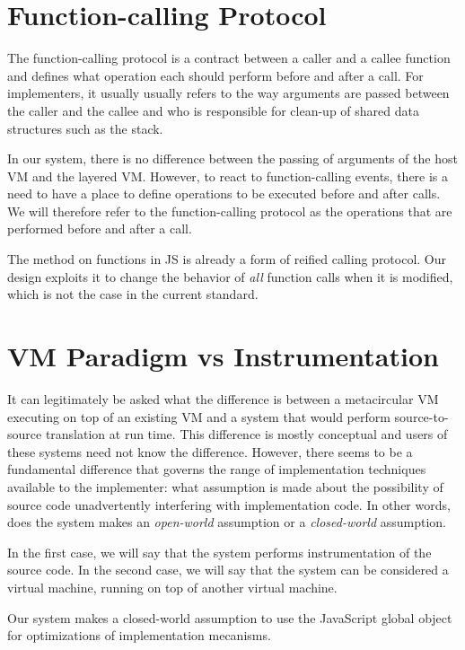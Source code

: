 \section{Function-calling Protocol}

The function-calling protocol is a contract between a caller and a callee
function and defines what operation each should perform before and after a
call. For implementers, it usually usually refers to the way arguments are
passed between the caller and the callee and who is responsible for clean-up of
shared data structures such as the stack.

In our system, there is no difference between the passing of arguments of the
host VM and the layered VM. However, to react to function-calling events, there
is a need to have a place to define operations to be executed before and after
calls. We will therefore refer to the function-calling protocol as the
operations that are performed before and after a call. 

The  method on functions in JS is already a form of reified calling
protocol. Our design exploits it to change the behavior of \textit{all} function
calls when it is modified, which is not the case in the current standard.

\section{VM Paradigm vs Instrumentation}

It can legitimately be asked what the difference is between a metacircular VM
executing on top of an existing VM and a system that would perform
source-to-source translation at run time. This difference is mostly conceptual
and users of these systems need not know the difference. However, there seems
to be a fundamental difference that governs the range of implementation
techniques available to the implementer: what assumption is made about the
possibility of source code unadvertently interfering with implementation code.
In other words, does the system makes an \textit{open-world} assumption or a
\textit{closed-world} assumption.

In the first case, we will say that the system performs instrumentation of the
source code. In the second case, we will say that the system can be considered
a virtual machine, running on top of another virtual machine. 

Our system makes a closed-world assumption to use the JavaScript global object
for optimizations of implementation mecanisms.

